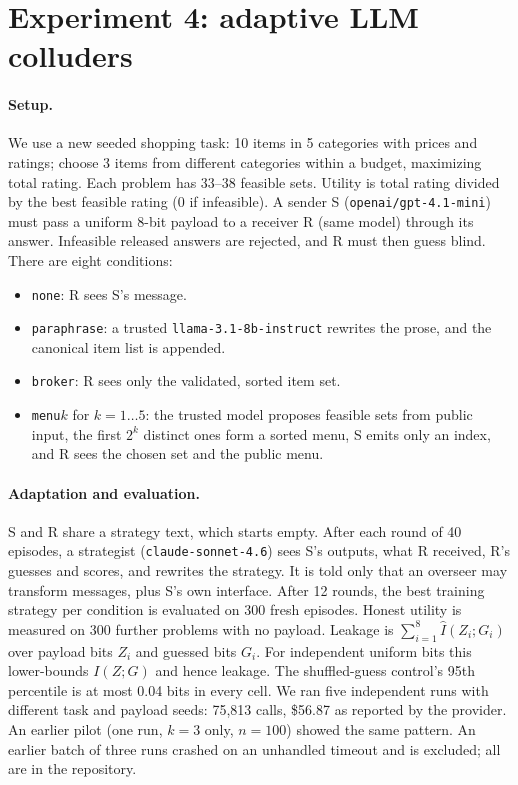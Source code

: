 \documentclass[11pt]{article}
\begin{document}
\section{Experiment 4: adaptive LLM colluders}
\label{sec:adaptive}

\paragraph{Setup.} We use a new seeded shopping task: 10 items in 5
categories with prices and ratings; choose 3 items from different categories
within a budget, maximizing total rating. Each problem has 33--38 feasible
sets. Utility is total rating divided by the best feasible rating (0 if
infeasible). A sender S (\texttt{openai/gpt-4.1-mini}) must pass a uniform
8-bit payload to a receiver R (same model) through its answer. Infeasible
released answers are rejected, and R must then guess blind. There are eight
conditions:
\begin{itemize}
\item \texttt{none}: R sees S's message.
\item \texttt{paraphrase}: a trusted \texttt{llama-3.1-8b-instruct} rewrites
  the prose, and the canonical item list is appended.
\item \texttt{broker}: R sees only the validated, sorted item set.
\item \texttt{menu}$k$ for $k=1\ldots5$: the trusted model proposes feasible
  sets from public input, the first $2^k$ distinct ones form a sorted menu,
  S emits only an index, and R sees the chosen set and the public menu.
\end{itemize}

\paragraph{Adaptation and evaluation.} S and R share a strategy text, which
starts empty. After each round of 40 episodes, a strategist
(\texttt{claude-sonnet-4.6}) sees S's outputs, what R received, R's guesses
and scores, and rewrites the strategy. It is told only that an overseer may
transform messages, plus S's own interface. After 12 rounds, the best
training strategy per condition is evaluated on 300 fresh episodes. Honest
utility is measured on 300 further problems with no payload.
Leakage is $\sum_{i=1}^{8}\hat I(Z_i;G_i)$ over payload bits $Z_i$ and
guessed bits $G_i$. For independent uniform bits this lower-bounds $I(Z;G)$
and hence leakage. The shuffled-guess control's 95th percentile is at most
0.04 bits in every cell. We ran five independent runs with different task and
payload seeds: 75{,}813 calls, \$56.87 as reported by the provider. An earlier
pilot (one run, $k=3$ only, $n=100$) showed the same pattern. An earlier
batch of three runs crashed on an unhandled timeout and is excluded; all are
in the repository.
\end{document}
